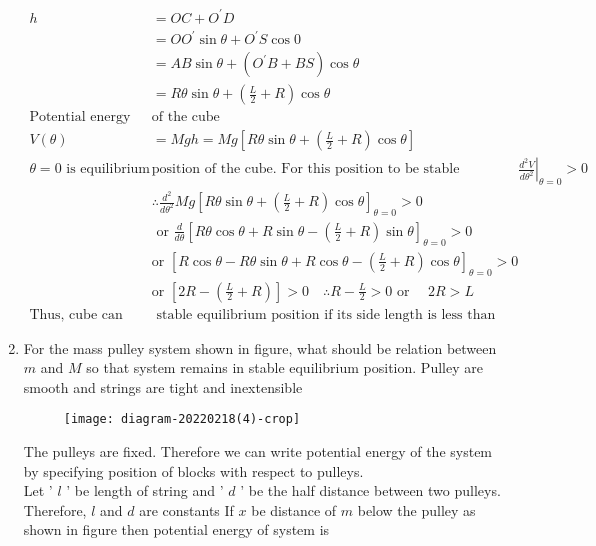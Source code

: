 \begin{enumerate}
\begin{answer}
\begin{align*}
		h&=O C+O^{\prime} D \\
		&=O O^{\prime} \sin \theta+O^{\prime} S \cos 0 \\
		&=A B \sin \theta+\left(O^{\prime} B+B S\right) \cos \theta \\
		&=R \theta \sin \theta+\left(\frac{L}{2}+R\right) \cos \theta\\
		\text{Potential energy }&\text{of the cube}\\
		V(\theta)&=M g h=M g\left[R \theta \sin \theta+\left(\frac{L}{2}+R\right) \cos \theta\right]\\
		\text{$\theta=0$ is equilibrium }&\text{position of the cube. For this position to be stable equilibrium position, $\left.\frac{d^{2} V}{d \theta^{2}}\right|_{\theta=0}>0$}\\
	&\therefore \frac{d^{2}}{d \theta^{2}} M g\left[R \theta \sin \theta+\left(\frac{L}{2}+R\right) \cos \theta\right]_{\theta=0}>0\\
&\text{	or }\frac{d}{d \theta}\left[R \theta \cos \theta+R \sin \theta-\left(\frac{L}{2}+R\right) \sin \theta\right]_{\theta=0}>0\\
	&\text{or }\left[R \cos \theta-R \theta \sin \theta+R \cos \theta-\left(\frac{L}{2}+R\right) \cos \theta\right]_{\theta=0}>0\\
	&\text{or }\left[2 R-\left(\frac{L}{2}+R\right)\right]>0 \quad \therefore R-\frac{L}{2}>0\text{ or }\quad 2 R>L\\
	\text{Thus, cube can be in}&\text{ stable equilibrium position if its side length is less than diameter of hemisphere}
		\end{align*}
	\end{answer}
	\item  For the mass pulley system shown in figure, what should be relation between $m$ and $M$ so that system remains in stable equilibrium position. Pulley are smooth and strings are tight and inextensible
	\begin{figure}[H]
		\centering
		\texttt{[image: diagram-20220218(4)-crop]}
	\end{figure}
	\begin{answer}
		The pulleys are fixed. Therefore we can write potential energy of the system by specifying position of blocks with respect to pulleys.\\
		Let ' $l$ ' be length of string and ' $d$ ' be the half distance between two pulleys. Therefore, $l$ and $d$ are constants If $x$ be distance of $m$ below the pulley as shown in figure then potential energy of system is

\end{answer}
\end{enumerate}
